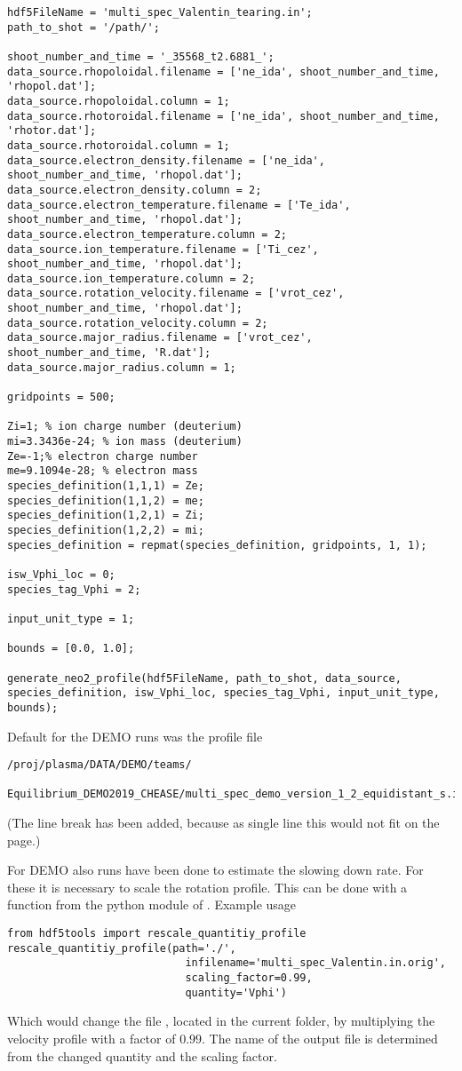 \documentclass{article}
\newcommand{\vv}[1]{\texttt{\detokenize{#1}}}
\begin{document}
\begin{verbatim}
hdf5FileName = 'multi_spec_Valentin_tearing.in';
path_to_shot = '/path/';

shoot_number_and_time = '_35568_t2.6881_';
data_source.rhopoloidal.filename = ['ne_ida', shoot_number_and_time, 'rhopol.dat'];
data_source.rhopoloidal.column = 1;
data_source.rhotoroidal.filename = ['ne_ida', shoot_number_and_time, 'rhotor.dat'];
data_source.rhotoroidal.column = 1;
data_source.electron_density.filename = ['ne_ida', shoot_number_and_time, 'rhopol.dat'];
data_source.electron_density.column = 2;
data_source.electron_temperature.filename = ['Te_ida', shoot_number_and_time, 'rhopol.dat'];
data_source.electron_temperature.column = 2;
data_source.ion_temperature.filename = ['Ti_cez', shoot_number_and_time, 'rhopol.dat'];
data_source.ion_temperature.column = 2;
data_source.rotation_velocity.filename = ['vrot_cez', shoot_number_and_time, 'rhopol.dat'];
data_source.rotation_velocity.column = 2;
data_source.major_radius.filename = ['vrot_cez', shoot_number_and_time, 'R.dat'];
data_source.major_radius.column = 1;

gridpoints = 500;

Zi=1; % ion charge number (deuterium)
mi=3.3436e-24; % ion mass (deuterium)
Ze=-1;% electron charge number
me=9.1094e-28; % electron mass
species_definition(1,1,1) = Ze;
species_definition(1,1,2) = me;
species_definition(1,2,1) = Zi;
species_definition(1,2,2) = mi;
species_definition = repmat(species_definition, gridpoints, 1, 1);

isw_Vphi_loc = 0;
species_tag_Vphi = 2;

input_unit_type = 1;

bounds = [0.0, 1.0];

generate_neo2_profile(hdf5FileName, path_to_shot, data_source, species_definition, isw_Vphi_loc, species_tag_Vphi, input_unit_type, bounds);
\end{verbatim}
Default for the DEMO
runs was the profile file
\begin{verbatim}
/proj/plasma/DATA/DEMO/teams/
  Equilibrium_DEMO2019_CHEASE/multi_spec_demo_version_1_2_equidistant_s.in
\end{verbatim}
(The line break has been added, because as single line this would not fit
on the page.)

For DEMO also runs have been done to estimate the slowing down rate. For
these it is necessary to scale the rotation profile. This can be done
with a function from the python module \vv{hdf5tools} of \vv{NEO-2}.
Example usage
\begin{verbatim}
from hdf5tools import rescale_quantitiy_profile
rescale_quantitiy_profile(path='./',
                            infilename='multi_spec_Valentin.in.orig',
                            scaling_factor=0.99,
                            quantity='Vphi')
\end{verbatim}
Which would change the file \vv{multi_spec_Valentin.in.orig}, located in
the current folder, by multiplying the velocity profile with a factor of
$0.99$. The name of the output file is determined from the changed
quantity and the scaling factor.
\end{document}

